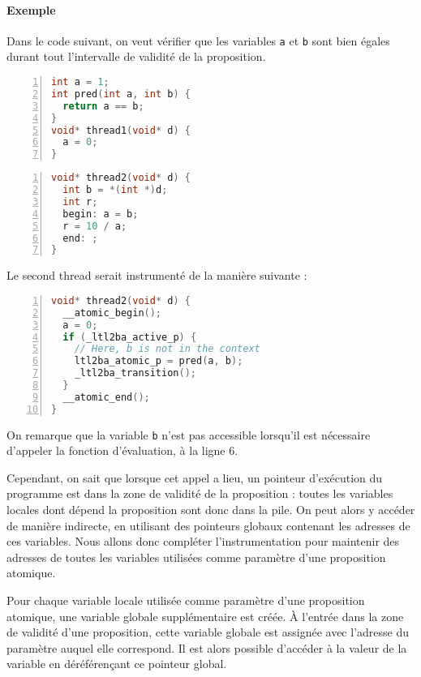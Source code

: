 \paragraph{Exemple}
Dans le code suivant, on veut vérifier que les variables \texttt{a} et
\texttt{b} sont bien égales durant tout l'intervalle de validité de la
proposition.

\noindent\begin{minipage}{.45\textwidth}
  \begin{lstlisting}[language=C, frame=single, numbers=left, caption=Thread 1,
    xleftmargin=1.6em]
int a = 1;
int pred(int a, int b) {
  return a == b;
}
void* thread1(void* d) {
  a = 0;
}
\end{lstlisting}
\end{minipage}\hfill
\begin{minipage}{.45\textwidth}
  \begin{lstlisting}[language=C, frame=single, numbers=left, caption=Thread 2,
    xleftmargin=1.6em]
void* thread2(void* d) {
  int b = *(int *)d;
  int r;
  begin: a = b;
  r = 10 / a;
  end: ;
}
\end{lstlisting}
\end{minipage}

Le second thread serait instrumenté de la manière suivante :

\begin{lstlisting}[language=C, frame=single, numbers=left,
  caption=Thread 2 instrumenté, xleftmargin=1.6em]
void* thread2(void* d) {
  __atomic_begin();
  a = 0;
  if (_ltl2ba_active_p) {
    // Here, b is not in the context
    ltl2ba_atomic_p = pred(a, b);
    _ltl2ba_transition();
  }
  __atomic_end();
}
\end{lstlisting}

On remarque que la variable \texttt{b} n'est pas accessible lorsqu'il
est nécessaire d'appeler la fonction d'évaluation, à la ligne 6.

Cependant, on sait que lorsque cet appel a lieu, un pointeur d'exécution
du programme est dans la zone de validité de la proposition : toutes les
variables locales dont dépend la proposition sont donc dans la pile. On
peut alors y accéder de manière indirecte, en utilisant des pointeurs
globaux contenant les adresses de ces variables. Nous allons donc
compléter l'instrumentation pour maintenir des adresses de toutes les
variables utilisées comme paramètre d'une proposition atomique.

Pour chaque variable locale utilisée comme paramètre d'une proposition
atomique, une variable globale supplémentaire est créée. À l'entrée dans
la zone de validité d'une proposition, cette variable globale est
assignée avec l'adresse du paramètre auquel elle correspond. Il est
alors possible d'accéder à la valeur de la variable en déréférençant ce
pointeur global.

